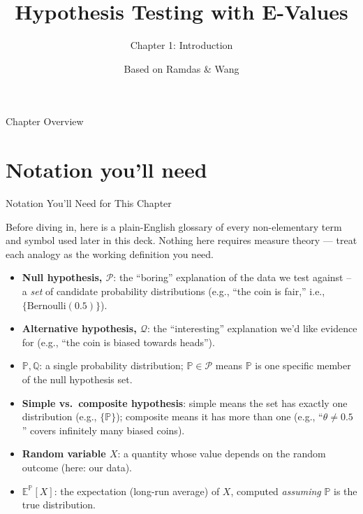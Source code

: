 \documentclass[aspectratio=169,10pt]{beamer}
\title[E-Values -- Ch.1]{Hypothesis Testing with E-Values}
\subtitle{Chapter 1: Introduction}
\author{Based on Ramdas \& Wang}
\institute{arXiv:2410.23614}
\date{}
\begin{document}
\begin{frame}
  \titlepage
\end{frame}

\begin{frame}{Chapter Overview}
  \tableofcontents
\end{frame}

\section{Notation you'll need}

\begin{frame}[allowframebreaks]{Notation You'll Need for This Chapter}

Before diving in, here is a plain-English glossary of every non-elementary
term and symbol used later in this deck. Nothing here requires measure
theory --- treat each analogy as the working definition you need.

\begin{itemize}
  \item \textbf{Null hypothesis, $\mathcal{P}$}: the ``boring'' explanation of
    the data we test against -- a \emph{set} of candidate probability
    distributions (e.g., ``the coin is fair,'' i.e., $\{\text{Bernoulli}(0.5)\}$).
  \item \textbf{Alternative hypothesis, $\mathcal{Q}$}: the ``interesting''
    explanation we'd like evidence for (e.g., ``the coin is biased towards
    heads'').
  \item \textbf{$\mathbb{P}, \mathbb{Q}$}: a single probability distribution;
    $\mathbb{P}\in\mathcal{P}$ means $\mathbb{P}$ is one specific member of
    the null hypothesis set.
  \item \textbf{Simple vs.\ composite hypothesis}: simple means the set has
    exactly one distribution (e.g., $\{\mathbb{P}\}$); composite means it has
    more than one (e.g., ``$\theta \neq 0.5$'' covers infinitely many biased
    coins).
  \item \textbf{Random variable $X$}: a quantity whose value depends on
    the random outcome (here: our data).
  \item \textbf{$\mathbb{E}^{\mathbb{P}}[X]$}: the expectation (long-run
    average) of $X$, computed \emph{assuming} $\mathbb{P}$ is the true
    distribution.

\framebreak


\end{itemize}
\end{frame}
\end{document}
